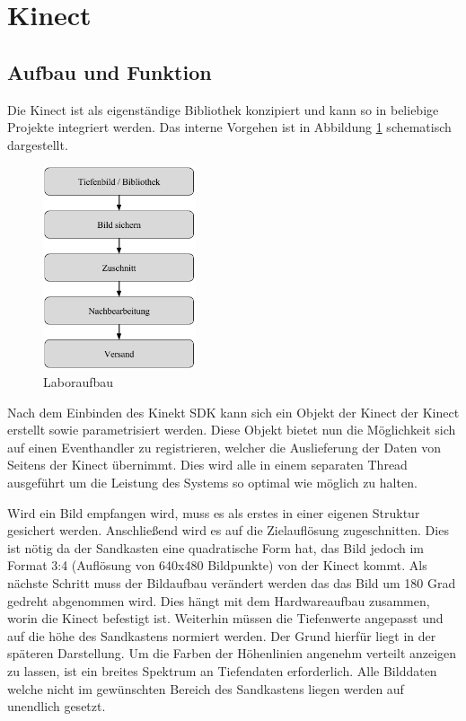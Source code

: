 \section{Kinect}
\begin{Spacing}{\mylinespace}

\subsection{Aufbau und Funktion}

Die Kinect ist als eigenständige Bibliothek konzipiert und kann so in beliebige Projekte integriert werden. Das interne Vorgehen ist in Abbildung \ref{fig:kinectdll} schematisch dargestellt. 

\begin{figure}[hbtp]
	\vspace{15px}
	\centering
	\includegraphics[width=0.4\textwidth]{graphics/block_dll.png}
	\caption{Laboraufbau}
	\label{fig:kinectdll}
\end{figure}

Nach dem Einbinden des Kinekt SDK kann sich ein Objekt der Kinect der Kinect erstellt sowie parametrisiert werden. Diese Objekt bietet nun die Möglichkeit sich auf einen Eventhandler zu registrieren, welcher die Auslieferung der Daten von Seitens der Kinect übernimmt. Dies wird alle in einem separaten Thread ausgeführt um die Leistung des Systems so optimal wie möglich zu halten.

Wird ein Bild empfangen wird, muss es als erstes in einer eigenen Struktur gesichert werden. Anschließend wird es auf die Zielauflösung zugeschnitten.
Dies ist nötig da der Sandkasten eine quadratische Form hat, das Bild jedoch im Format 3:4 (Auflösung von 640x480 Bildpunkte) von der Kinect kommt.
Als nächste Schritt muss der Bildaufbau verändert werden das das Bild um 180 Grad gedreht abgenommen wird. Dies hängt mit dem Hardwareaufbau zusammen, worin die Kinect befestigt ist. Weiterhin müssen die Tiefenwerte angepasst und auf die höhe des Sandkastens normiert werden. Der Grund hierfür liegt in der späteren Darstellung. Um die Farben der Höhenlinien angenehm verteilt anzeigen zu lassen, ist ein breites Spektrum an Tiefendaten erforderlich. Alle Bilddaten welche nicht im gewünschten Bereich des Sandkastens liegen werden auf unendlich gesetzt.


\end{Spacing}
